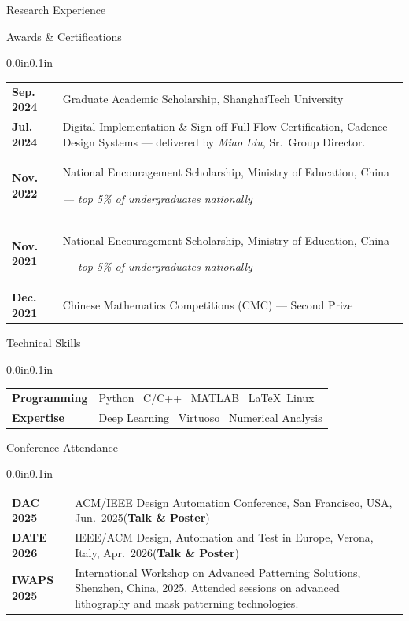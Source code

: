 \documentclass{resume}
\makeatletter
\newcommand{\entry}[2]{#1 & #2 \tabularnewline}
\newcommand{\tableEnv}[2]{%
  \begin{rSection}{#1}
    \begin{adjustwidth}{0.0in}{0.1in}
      \begin{tabularx}{\linewidth}{@{} >{\bfseries}l @{\hspace{5ex}} X @{}}
        #2
      \end{tabularx}
    \end{adjustwidth}
  \end{rSection}
}
\makeatother
\begin{document}
\begin{rSection}{Research Experience}

\end{rSection}

\tableEnv{Awards \& Certifications}{
  \entry{Sep. 2024}{Graduate Academic Scholarship, ShanghaiTech University}
  
  \entry{Jul. 2024}{Digital Implementation \& Sign-off Full-Flow Certification,
    Cadence Design Systems --- delivered by \textit{Miao Liu},
    Sr.\ Group Director.}
    
  \entry{Nov. 2022}{National Encouragement Scholarship, Ministry of Education, China 
  
  \em{— top 5\% of undergraduates nationally}}
  \entry{Nov. 2021}{National Encouragement Scholarship, Ministry of Education, China 
  
  \em{— top 5\% of undergraduates nationally}}
  \entry{Dec. 2021}{Chinese Mathematics Competitions (CMC) --- Second Prize}
}

\tableEnv{Technical Skills}{
  \entry{Programming}{Python \textperiodcentered\ C/C++ \textperiodcentered\ MATLAB \textperiodcentered\ \LaTeX \textperiodcentered\ Linux}
  \entry{Expertise}{Deep Learning \textperiodcentered\ Virtuoso \textperiodcentered\ Numerical Analysis}
}

\tableEnv{Conference Attendance}{
  \entry{DAC 2025}{ACM/IEEE Design Automation Conference, San Francisco, USA, Jun.\ 2025({\bf Talk \& Poster})}
  \entry{DATE 2026}{IEEE/ACM Design, Automation and Test in Europe, Verona, Italy, Apr.\ 2026({\bf Talk \& Poster})}
  \entry{IWAPS 2025}{International Workshop on Advanced Patterning Solutions, Shenzhen, China, 2025.
    Attended sessions on advanced lithography and mask patterning technologies.}
}
\end{document}
